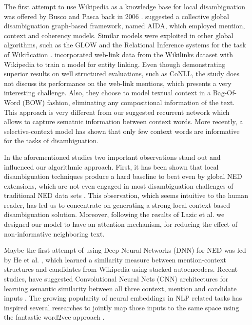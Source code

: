 \documentclass[11pt]{article}
\begin{document}
The first attempt to use Wikipedia as a knowledge base for local disambiguation was offered by Busco and Pasca back in 2006 \cite{Bunescu2006}.  suggested a collective global disambiguation graph-based framework, named AIDA, which employed mention, context and coherency models. Similar models were exploited in other global algorithms, such as the GLOW and the Relational Inference systems for the task of Wikification \cite{Ratinov2011,Cheng2013}.  incorporated web-link data from the Wikilinks dataset \cite{Singh2012} with Wikipedia to train a model for entity linking. Even though demonstrating superior results on well structured evaluations, such as CoNLL, the study does not discuss its performance on the web-link mentions, which presents a very interesting challenge. Also, they choose to model textual context in a Bag-Of-Word (BOW) fashion, eliminating any compositional information of the text. This approach is very different from our suggested recurrent network which allows to capture sematnic information between context words.  More recently, a selective-context model \cite{Lazic2015} has shown that only few context words are informative for the tasks of disambiguation.

In the aforementioned studies two important observations stand out and influenced our algorithmic approach. First, it has been shown that local disambiguation techniques produce a hard baseline to beat even by global NED extensions, which are not even engaged in most disambiguation challenges of traditional NED data sets \cite{Ratinov2011,hoffart2011robust}. This observation, which seems intuitive to the human reader, has led us to concentrate on generating a strong local context-based disambiguation solution. Moreover, following the results of Lazic et al. we designed our model to have an attention mechanism, for reducing the effect of non-informative neighboring text.

Maybe the first attempt of using Deep Neural Networks (DNN) for NED was led by He et al. \cite{He2013}, which learned a similarity measure between mention-context structures and candidates from Wikipedia using stacked autoencoders. Recent studies, have suggested Convolutional Neural Nets (CNN) architectures for learning semantic similarity between all three context, mention and candidate inputs \cite{sun2015modeling,francis2016capturing}. The growing popularity of neural embeddings in NLP related tasks has inspired several researches to jointly map those inputs to the same space using the fantastic word2vec approach \cite{yamada2016joint,Melamud2014}.
\end{document}
